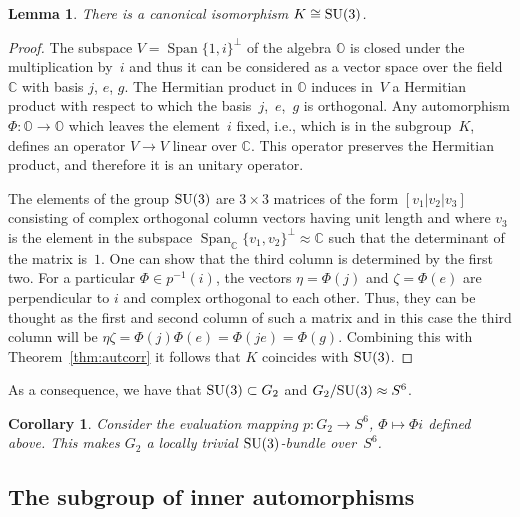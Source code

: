 \documentclass[pdftex]{sigma}
\numberwithin{equation}{section}
\newtheorem{Corollary}[Theorem]{Corollary}
\newtheorem{Lemma}[Theorem]{Lemma}
\DeclareMathOperator{\Span}{Span}
\newcommand{\SC}{\mathbb{C}} %
\newcommand{\SO}{\mathbb{O}} %
\begin{document}
\begin{Lemma} \label{lem:fibsu3}
 There is a canonical isomorphism $K \cong {\rm SU}(3)$.
\end{Lemma}
\begin{proof}
 The subspace $V=\Span \{1,i\}^\perp$ of the algebra $\SO$ is closed under the multiplication by~$i$ and thus it can be considered as a vector space over the field $\SC$ with basis $j$, $e$, $g$. The Hermitian product in $\SO$ induces in~$V$ a Hermitian product with respect to which the basis~$j$,~$e$,~$g$ is orthogonal. Any automorphism $\Phi\colon \SO \rightarrow \SO$ which leaves the element~$i$ fixed, i.e., which is in the subgroup~$K$, defines an operator $V \rightarrow V$ linear over $\SC$. This operator preserves the Hermitian product, and therefore it is an unitary operator.

 The elements of the group ${\rm SU}(3)$ are $3 \times 3$ matrices of the form $[v_1|v_2|v_3]$ consisting of complex orthogonal column vectors having unit length and where $v_3$ is the element in the subspace $\Span_\SC \{v_1,v_2\}^\perp \approx \SC$ such that the determinant of the matrix is~$1$. One can show that the third column is determined by the first two. For a particular $\Phi \in p^{-1}(i)$, the vectors $\eta=\Phi(j)$ and $\zeta=\Phi(e)$ are perpendicular to $i$ and complex orthogonal to each other. Thus, they can be thought as the first and second column of such a matrix and in this case the third column will be $\eta\zeta=\Phi(j)\Phi(e)=\Phi(je)=\Phi(g)$. Combining this with Theorem~\ref{thm:autcorr} it follows that $K$ coincides with ${\rm SU}(3)$.
\end{proof}

As a consequence, we have that ${\rm SU}(3) \subset G_2$ and $G_2 / {\rm SU}(3) \approx S^6$.

\begin{Corollary} Consider the evaluation mapping $p\colon G_2 \rightarrow S^6$, $\Phi \mapsto \Phi i$ defined above. This makes $G_2$ a locally trivial ${\rm SU}(3)$-bundle over~$S^6$.
\end{Corollary}

\subsection{The subgroup of inner automorphisms}\label{section2.3}
\end{document}
